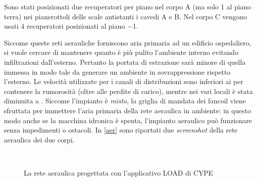 Sono stati posizionati due recuperatori per piano nel corpo A (ma solo \num{1} al piano terra) nei pianerottoli delle scale antistanti i cavedi A e B. Nel corpo C vengono usati 4 recuperatori posizionati al piano \num{-1}.

Siccome queste reti aerauliche forniscono aria primaria ad un edificio ospedaliero, si vuole cercare di mantenere quanto è più pulito l'ambiente interno evitando infiltrazioni dall'esterno. Pertanto la portata di estrazione sarà minore di quella immessa in modo tale da generare un ambiente in sovrappressione rispetto l'esterno. Le velocità utilizzate per i canali di distribuzioni sono inferiori ai  per contenere la rumorosità (oltre alle perdite di carico), mentre nei vari locali è stata diminuita a . Siccome l'impianto è \emph{misto}, la griglia di mandata dei fancoil viene sfruttata per immettere l'aria primaria della rete aeraulica in ambiente: in questo modo anche se la macchina idronica è spenta, l'impianto aeraulico può funzionare senza impedimenti o ostacoli. In \vref{aer} sono riportati due \emph{screenshot} della rete aeraulica dei due corpi. 

\begin{figure}
	\centering
	\\
	\caption{La rete aeraulica progettata con l'applicativo LOAD di CYPE}\label{aer}
\end{figure}

